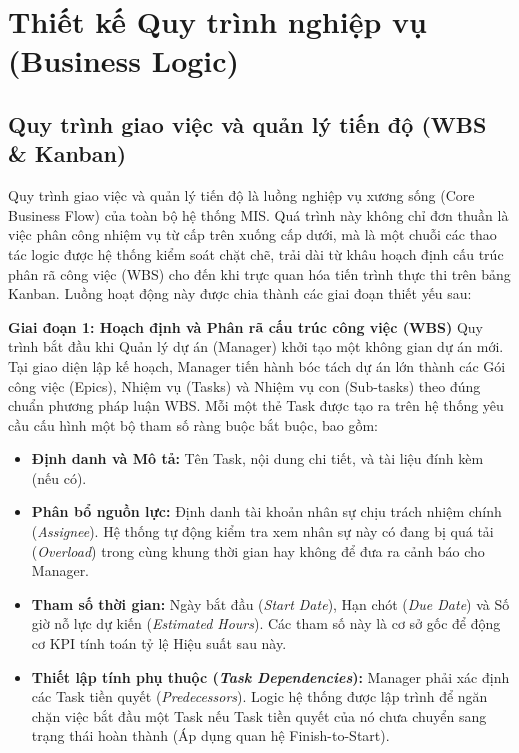 \documentclass[a4paper,13.5pt]{extreport}
\begin{document}
\section{Thiết kế Quy trình nghiệp vụ (Business Logic)} 
\subsection{Quy trình giao việc và quản lý tiến độ (WBS \& Kanban)}

Quy trình giao việc và quản lý tiến độ là luồng nghiệp vụ xương sống (Core Business Flow) của toàn bộ hệ thống MIS. Quá trình này không chỉ đơn thuần là việc phân công nhiệm vụ từ cấp trên xuống cấp dưới, mà là một chuỗi các thao tác logic được hệ thống kiểm soát chặt chẽ, trải dài từ khâu hoạch định cấu trúc phân rã công việc (WBS) cho đến khi trực quan hóa tiến trình thực thi trên bảng Kanban. Luồng hoạt động này được chia thành các giai đoạn thiết yếu sau:

\textbf{Giai đoạn 1: Hoạch định và Phân rã cấu trúc công việc (WBS)}
Quy trình bắt đầu khi Quản lý dự án (Manager) khởi tạo một không gian dự án mới. Tại giao diện lập kế hoạch, Manager tiến hành bóc tách dự án lớn thành các Gói công việc (Epics), Nhiệm vụ (Tasks) và Nhiệm vụ con (Sub-tasks) theo đúng chuẩn phương pháp luận WBS.
Mỗi một thẻ Task được tạo ra trên hệ thống yêu cầu cấu hình một bộ tham số ràng buộc bắt buộc, bao gồm: 
\begin{itemize}
    \item \textbf{Định danh và Mô tả:} Tên Task, nội dung chi tiết, và tài liệu đính kèm (nếu có).
    \item \textbf{Phân bổ nguồn lực:} Định danh tài khoản nhân sự chịu trách nhiệm chính (\textit{Assignee}). Hệ thống tự động kiểm tra xem nhân sự này có đang bị quá tải (\textit{Overload}) trong cùng khung thời gian hay không để đưa ra cảnh báo cho Manager.
    \item \textbf{Tham số thời gian:} Ngày bắt đầu (\textit{Start Date}), Hạn chót (\textit{Due Date}) và Số giờ nỗ lực dự kiến (\textit{Estimated Hours}). Các tham số này là cơ sở gốc để động cơ KPI tính toán tỷ lệ Hiệu suất sau này.
    \item \textbf{Thiết lập tính phụ thuộc (\textit{Task Dependencies}):} Manager phải xác định các Task tiền quyết (\textit{Predecessors}). Logic hệ thống được lập trình để ngăn chặn việc bắt đầu một Task nếu Task tiền quyết của nó chưa chuyển sang trạng thái hoàn thành (Áp dụng quan hệ Finish-to-Start).
\end{itemize}
\end{document}
